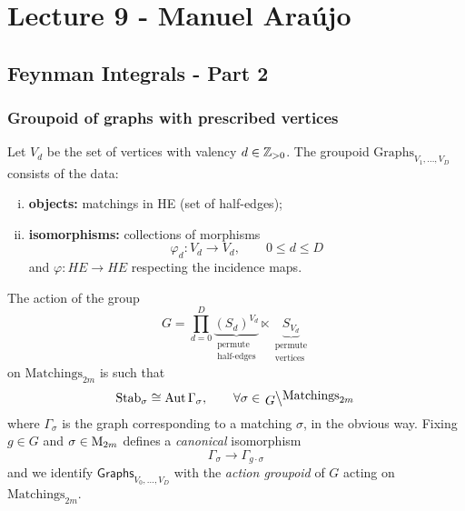 \chapter{Lecture 9 - Manuel Araújo}

\section{Feynman Integrals - Part 2}

\subsection{Groupoid of graphs with prescribed vertices}

Let $V_d$ be the set of vertices with valency $d \in \mathbb{Z}_{>0}$.
The groupoid $\mathrm{Graphs}_{V_1, \dots, V_D}$ consists of the data:
\begin{enumerate}[i)]
  \item \textbf{objects:} matchings in HE (set of half-edges);
  \item \textbf{isomorphisms:} collections of morphisms
    \begin{equation*}
      \varphi_d \colon V_d \longrightarrow V_d, \qquad 0 \leq d \leq D
    \end{equation*}
    and $\varphi \colon HE \to HE$ respecting the incidence maps.
\end{enumerate}

The action of the group
\begin{equation*}
  G = \prod_{d = 0}^D
  \underbrace{(S_d)^{V_d}}_{\substack{
      \text{permute} \\ \text{half-edges}
  }} \ltimes 
  \underbrace{S_{V_d}}_{\substack{
      \text{permute} \\ \text{vertices}
  }}
\end{equation*}
on $\text{Matchings}_{2m}$ is such that
\begin{equation*}
  \Stab_\sigma \cong \Aut \Gamma_\sigma, \qquad \forall \sigma \in \lbigslant{G}{\text{Matchings}_{2m}}
\end{equation*}
where $\Gamma_\sigma$ is the graph corresponding to a matching $\sigma$, in the obvious way.
Fixing $g \in G$ and $\sigma \in \mathrm{M}_{2m}$ defines a \textit{canonical} isomorphism
\begin{equation*}
  \Gamma_\sigma \longrightarrow \Gamma_{g \cdot \sigma}
\end{equation*}
and we identify $\mathsf{Graphs}_{V_0, \dots, V_D}$ with the \textit{action groupoid} of $G$ acting on $\text{Matchings}_{2m}$.

